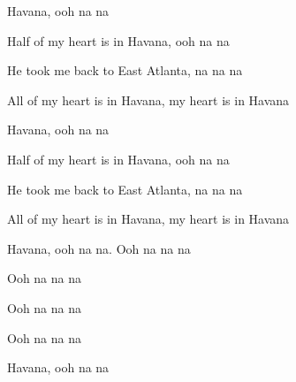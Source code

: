 \begin{song}
\bigskip


Havana, ooh na na  \par
Half of my heart is in Havana, ooh na na  \par
He took me back to East Atlanta, na na na  \par
All of my heart is in Havana, my heart is in Havana

\bigskip

Havana, ooh na na  \par
Half of my heart is in Havana, ooh na na  \par
He took me back to East Atlanta, na na na  \par
All of my heart is in Havana, my heart is in Havana

\bigskip

Havana, ooh na na.  Ooh na na na \par
{}  Ooh na na na \par
{}  Ooh na na na \par
{}  Ooh na na na \par

\bigskip

Havana, ooh na na \par

\end{song}
